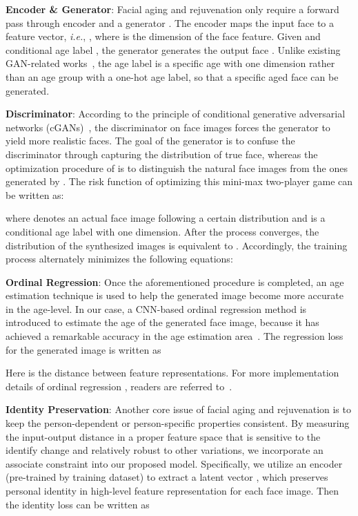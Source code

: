 \documentclass{article}
\begin{document}
{\bf\noindent Encoder \& Generator}:
Facial aging and rejuvenation only require a forward pass through encoder  and a generator . The encoder  maps the input face  to a feature vector, {\it i.e.}, , where  is the dimension of the face feature. Given  and conditional age label , the generator  generates the output face . Unlike existing GAN-related works~\cite{zhang2017age,yang2017learning}, the age label  is a specific age with one dimension rather than an age group with a one-hot age label, so that a specific aged face can be generated. 


{\bf\noindent Discriminator}:
According to the principle of conditional generative adversarial networks (cGANs)~\cite{mirza2014conditional}, the discriminator  on face images forces the generator  to yield more realistic faces. The goal of the generator  is to confuse the discriminator  through capturing the distribution of true face, whereas the optimization procedure of  is to distinguish the natural face images from the ones generated by . The risk function of optimizing this mini-max two-player game can be written as:

where  denotes an actual face image following a certain distribution  and  is a conditional age label with one dimension. After the process converges, the distribution of the synthesized images  is equivalent to . Accordingly, the training process alternately minimizes the following equations:


{\bf\noindent Ordinal Regression}:
Once the aforementioned procedure is completed, an age estimation technique is used to help the generated image become more accurate in the age-level. In our case, a CNN-based ordinal regression method  is introduced to estimate the age of the generated face image, because it has achieved a remarkable accuracy in the age estimation area~\cite{niu2016ordinal}. The regression loss for the generated image is written as 

Here  is the  distance between feature representations. For more implementation details of ordinal regression , readers are referred to~\cite{niu2016ordinal}.

{\bf\noindent Identity Preservation}:
Another core issue of facial aging and rejuvenation is to keep the person-dependent or person-specific properties consistent. By measuring the input-output distance in a proper feature space that is sensitive to the identify change and relatively robust to other variations, we incorporate an associate constraint into our proposed model. Specifically, we utilize an encoder  (pre-trained by training dataset) to extract a latent vector , which preserves personal identity in high-level feature representation for each face image. Then the identity loss can be written as
\end{document}
